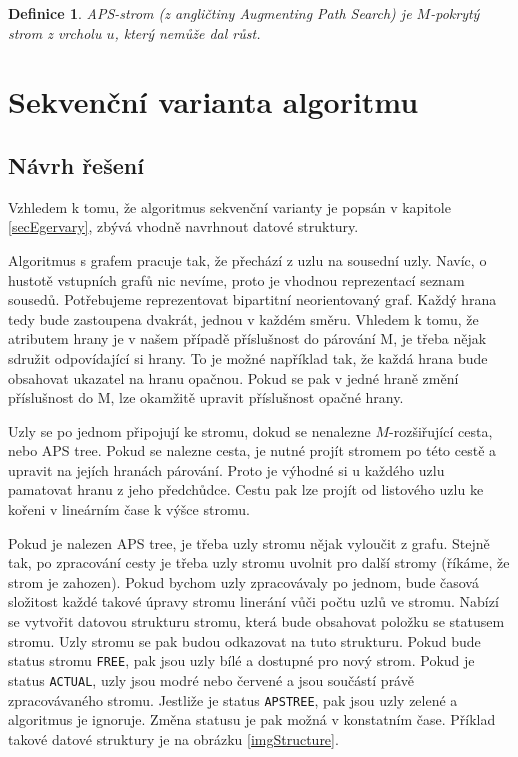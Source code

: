 \documentclass[a4paper, 11pt, titlepage, final]{article}[3. prosinec 2011]
\newtheorem{Definice}{Definice}
\begin{document}
\begin{Definice}
\textit{APS-strom} (z angličtiny Augmenting Path Search) je $M$-pokrytý strom z vrcholu $u$, který nemůže dal růst.
\end{Definice}

\section{Sekvenční varianta algoritmu}

\subsection{Návrh řešení}

Vzhledem k tomu, že algoritmus sekvenční varianty je popsán v kapitole \ref{secEgervary}, zbývá vhodně navrhnout datové struktury. 

Algoritmus s grafem pracuje tak, že přechází z uzlu na sousední uzly. Navíc, o hustotě vstupních grafů nic nevíme, proto je vhodnou reprezentací seznam sousedů. Potřebujeme reprezentovat bipartitní neorientovaný graf. Každý hrana tedy bude zastoupena dvakrát, jednou v každém směru. Vhledem k tomu, že atributem hrany je v našem případě příslušnost do párování M, je třeba nějak sdružit odpovídající si hrany. To je možné například tak, že každá hrana bude obsahovat ukazatel na hranu opačnou. Pokud se pak v jedné hraně změní příslušnost do M, lze okamžitě upravit příslušnost opačné hrany.

Uzly se po jednom připojují ke stromu, dokud se nenalezne $M$-rozšiřující cesta, nebo APS tree. Pokud se nalezne cesta, je nutné projít stromem po této cestě a upravit na jejích hranách párování. Proto je výhodné si u každého uzlu pamatovat hranu z jeho předchůdce. Cestu pak lze projít od listového uzlu ke kořeni v lineárním čase k výšce stromu. 

Pokud je nalezen APS tree, je třeba uzly stromu nějak vyloučit z grafu. Stejně tak, po zpracování cesty je třeba uzly stromu uvolnit pro další stromy (říkáme, že strom je zahozen). Pokud bychom uzly zpracovávaly po jednom, bude časová složitost každé takové úpravy stromu linerání vůči počtu uzlů ve stromu. Nabízí se vytvořit datovou strukturu stromu, která bude obsahovat položku se statusem stromu. Uzly stromu se pak budou odkazovat na tuto strukturu. Pokud bude status stromu \texttt{FREE}, pak jsou uzly bílé a dostupné pro nový strom. Pokud je status \texttt{ACTUAL}, uzly jsou modré nebo červené a jsou součástí právě zpracovávaného stromu. Jestliže je status \texttt{APSTREE}, pak jsou uzly zelené a algoritmus je ignoruje. Změna statusu je pak možná v konstatním čase. Příklad takové datové struktury je na obrázku \ref{imgStructure}.
\end{document}
